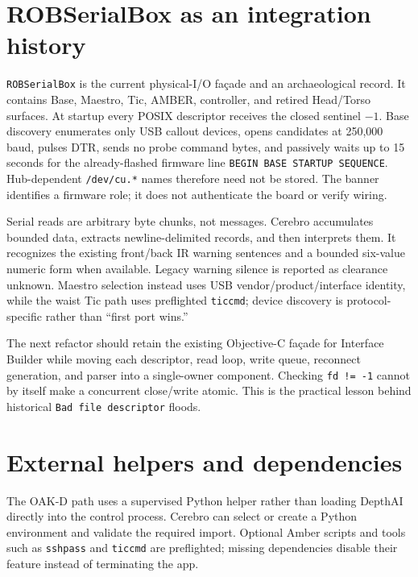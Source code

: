 \documentclass[10pt,openany]{book}
\begin{document}
\section{ROBSerialBox as an integration history}

\texttt{ROBSerialBox} is the current physical-I/O façade and an archaeological record. It contains Base, Maestro, Tic, AMBER, controller, and retired Head/Torso surfaces. At startup every POSIX descriptor receives the closed sentinel $-1$. Base discovery enumerates only USB callout devices, opens candidates at 250,000 baud, pulses DTR, sends no probe command bytes, and passively waits up to 15 seconds for the already-flashed firmware line \texttt{BEGIN BASE STARTUP SEQUENCE}. Hub-dependent \texttt{/dev/cu.*} names therefore need not be stored. The banner identifies a firmware role; it does not authenticate the board or verify wiring.

Serial reads are arbitrary byte chunks, not messages. Cerebro accumulates bounded data, extracts newline-delimited records, and then interprets them. It recognizes the existing front/back IR warning sentences and a bounded six-value numeric form when available. Legacy warning silence is reported as clearance unknown. Maestro selection instead uses USB vendor/product/interface identity, while the waist Tic path uses preflighted \texttt{ticcmd}; device discovery is protocol-specific rather than ``first port wins.''

The next refactor should retain the existing Objective-C façade for Interface Builder while moving each descriptor, read loop, write queue, reconnect generation, and parser into a single-owner component. Checking \texttt{fd != -1} cannot by itself make a concurrent close/write atomic. This is the practical lesson behind historical \texttt{Bad file descriptor} floods.

\section{External helpers and dependencies}

The OAK-D path uses a supervised Python helper rather than loading DepthAI directly into the control process. Cerebro can select or create a Python environment and validate the required import. Optional Amber scripts and tools such as \texttt{sshpass} and \texttt{ticcmd} are preflighted; missing dependencies disable their feature instead of terminating the app.
\end{document}
